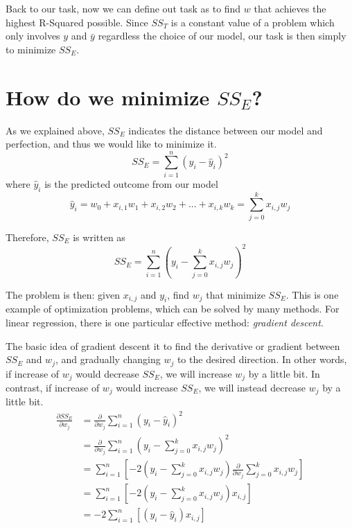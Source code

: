 \documentclass[
	letterpaper
]{article}
\begin{document}
Back to our task, now we can define out task as to find $w$ that achieves the highest R-Squared possible.
Since $SS_T$ is a constant value of a problem which only involves $y$ and $\bar y$ regardless the choice of our model, our task is then simply to minimize $SS_E$.

\section{How do we minimize $SS_E$?}
As we explained above, $SS_E$ indicates the distance between our model and perfection, and thus we would like to minimize it.
\begin{equation}
SS_E = \sum_{i = 1}^n (y_i - \hat y_i) ^2
\end{equation}
where $\hat y_i$ is the predicted outcome from our model
\begin{equation}
\hat y_i = w_0 + x_{i, 1}w_1 + x_{i, 2}w_2 + ... + x_{i, k}w_k = \sum_{j=0} ^k x_{i, j}w_j
\end{equation}

Therefore, $SS_E$ is written as
\begin{equation}
SS_E = \sum_{i = 1}^n (y_i - \sum_{j=0} ^k x_{i, j}w_j) ^2
\end{equation}

The problem is then: given $x_{i, j}$ and $y_i$, find $w_j$ that minimize $SS_E$.
This is one example of optimization problems, which can be solved by many methods.
For linear regression, there is one particular effective method: \textit{gradient descent}.

The basic idea of gradient descent it to find the derivative or gradient between $SS_E$ and $w_j$, and gradually changing $w_j$ to the desired direction.
In other words, if increase of $w_j$ would decrease $SS_E$, we will increase $w_j$ by a little bit. 
In contrast, if increase of $w_j$ would increase $SS_E$, we will instead  decrease $w_j$ by a little bit. 
\begin{equation}
\begin{split}
\frac{\partial SS_E}{\partial w_j} & = \frac{\partial}{\partial w_j} \sum_{i = 1}^n (y_i - \hat y_i) ^2 \\
&= \frac{\partial}{\partial w_j}\sum_{i = 1}^n (y_i - \sum_{j=0} ^k x_{i, j}w_j) ^2\\
& = \sum_{i = 1}^n \left[-2(y_i - \sum_{j=0} ^k x_{i, j}w_j)  \frac{\partial}{\partial w_j}\sum_{j=0} ^k x_{i, j}w_j \right]\\
& = \sum_{i = 1}^n \left[ -2(y_i - \sum_{j=0} ^k x_{i, j}w_j)  x_{i, j}\right] \\
& = -2\sum_{i = 1}^n\left[(y_i - \hat y_i)  x_{i, j}\right]\\
\end{split}
\end{equation}
\end{document}
